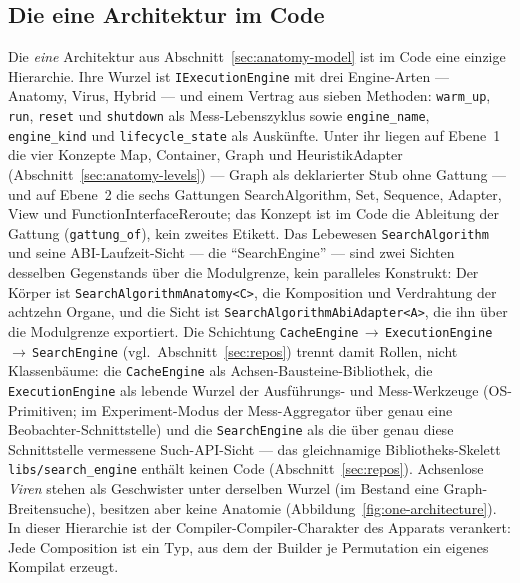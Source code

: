 \begin{nurlang}
\subsection{Die eine Architektur im Code}\label{sec:impl-architecture}
Die \emph{eine} Architektur aus Abschnitt~\ref{sec:anatomy-model} ist im Code eine einzige Hierarchie.
Ihre Wurzel ist \texttt{IExecutionEngine} mit drei Engine-Arten --- Anatomy, Virus, Hybrid --- und einem
Vertrag aus sieben Methoden: \texttt{warm\_up}, \texttt{run}, \texttt{reset} und \texttt{shutdown} als
Mess-Lebenszyklus sowie \texttt{engine\_name}, \texttt{engine\_kind} und \texttt{lifecycle\_state} als
Auskünfte. Unter ihr liegen auf Ebene~1 die vier Konzepte Map, Container, Graph und HeuristikAdapter
(Abschnitt~\ref{sec:anatomy-levels}) --- Graph als deklarierter Stub ohne Gattung --- und auf Ebene~2 die
sechs Gattungen SearchAlgorithm, Set, Sequence, Adapter, View und FunctionInterfaceReroute; das Konzept ist im
Code die Ableitung der Gattung (\texttt{gattung\_of}), kein zweites Etikett. Das Lebewesen
\texttt{SearchAlgorithm} und seine ABI-Laufzeit-Sicht --- die \enquote{SearchEngine} --- sind zwei
Sichten desselben Gegenstands über die Modulgrenze, kein paralleles Konstrukt: Der Körper ist
\texttt{SearchAlgorithmAnatomy<C>}, die Komposition und Verdrahtung der achtzehn Organe, und die Sicht ist
\texttt{SearchAlgorithmAbiAdapter<A>}, die ihn über die Modulgrenze exportiert. Die Schichtung
\texttt{CacheEngine}\,$\to$\,\texttt{ExecutionEngine}\,$\to$\,\texttt{SearchEngine} (vgl.\ Abschnitt~\ref{sec:repos})
trennt damit Rollen, nicht Klassenbäume: die \texttt{CacheEngine} als Achsen-Bausteine-Bibliothek, die
\texttt{ExecutionEngine} als lebende Wurzel der Ausführungs- und Mess-Werkzeuge (OS-Primitiven; im
Experiment-Modus der Mess-Aggregator über genau eine Beobachter-Schnittstelle) und die
\texttt{SearchEngine} als die über genau diese Schnittstelle vermessene Such-API-Sicht --- das
gleichnamige Bibliotheks-Skelett \texttt{libs/search\_engine} enthält keinen Code
(Abschnitt~\ref{sec:repos}). Achsenlose \emph{Viren} stehen als Geschwister unter derselben Wurzel (im
Bestand eine Graph-Breitensuche), besitzen aber keine Anatomie (Abbildung~\ref{fig:one-architecture}). In
dieser Hierarchie ist der Compiler-Compiler-Charakter des Apparats verankert: Jede Composition ist ein Typ,
aus dem der Builder je Permutation ein eigenes Kompilat erzeugt.
\end{nurlang}
